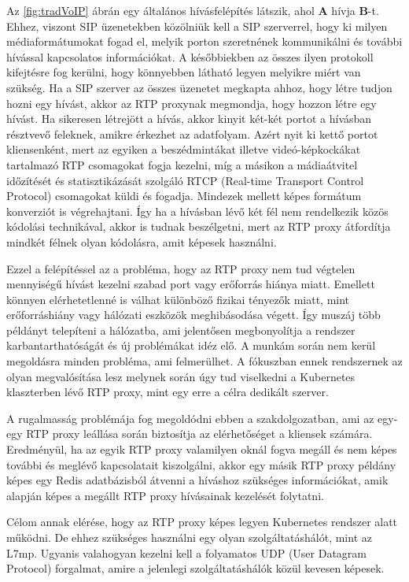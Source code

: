 Az \ref{fig:tradVoIP} ábrán egy általános hívásfelépítés látszik, ahol \textbf{A} hívja 
\textbf{B}-t. 
Ehhez, viszont SIP üzenetekben közölniük kell a SIP szerverrel, hogy ki milyen 
médiaformátumokat fogad el, melyik porton szeretnének kommunikálni és további hívással kapcsolatos információkat. A későbbiekben az összes ilyen protokoll kifejtésre fog
kerülni, hogy könnyebben látható legyen melyikre miért van szükség. Ha a SIP szerver
az összes üzenetet megkapta ahhoz, hogy létre tudjon hozni egy hívást, akkor az 
RTP proxynak megmondja, hogy hozzon létre egy hívást. Ha sikeresen létrejött a 
hívás, akkor kinyit két-két portot a hívásban résztvevő feleknek, amikre érkezhet
az adatfolyam. Azért nyit ki kettő portot kliensenként, mert az egyiken a
beszédmintákat illetve videó-képkockákat tartalmazó RTP csomagokat fogja
kezelni, míg a másikon a mádiaátvitel időzítését és statisztikázását szolgáló
RTCP (Real-time Transport Control Protocol) csomagokat küldi és fogadja. Mindezek mellett 
képes formátum konverziót is végrehajtani. Így ha a hívásban lévő két fél nem rendelkezik 
közös kódolási technikával, akkor is tudnak beszélgetni, mert az RTP proxy átfordítja 
mindkét félnek olyan kódolásra, amit képesek használni.

Ezzel a felépítéssel az a probléma, hogy az RTP proxy nem tud végtelen mennyiségű
hívást kezelni szabad port vagy erőforrás hiánya miatt. Emellett könnyen elérhetetlenné 
is válhat különböző fizikai tényezők miatt, mint erőforráshiány vagy hálózati eszközök 
meghibásodása végett. Így muszáj több példányt telepíteni a hálózatba, ami jelentősen 
megbonyolítja a rendszer karbantarthatóságát és új problémákat idéz elő. A munkám során
nem kerül megoldásra minden probléma, ami felmerülhet. A fókuszban ennek rendszernek az
olyan megvalósítása lesz melynek során úgy tud viselkedni a Kubernetes klaszterben lévő
RTP proxy, mint egy erre a célra dedikált szerver.

A rugalmasság problémája fog megoldódni ebben a szakdolgozatban, ami az egy-egy RTP proxy
leállása során biztosítja az elérhetőséget a kliensek számára. Eredményül, ha az egyik
RTP proxy valamilyen oknál fogva megáll és nem képes további és meglévő kapcsolatait 
kiszolgálni, akkor egy másik RTP proxy példány képes egy Redis adatbázisból átvenni
a híváshoz szükséges információkat, amik alapján képes a megállt RTP proxy hívásainak
kezelését folytatni. 

Célom annak elérése, hogy az RTP proxy képes legyen Kubernetes rendszer alatt 
működni. De ehhez szükséges használni egy olyan szolgáltatáshálót, mint az L7mp. Ugyanis 
valahogyan kezelni kell a folyamatos UDP (User Datagram Protocol) forgalmat, amire
a jelenlegi szolgáltatáshálók közül kevesen képesek.

